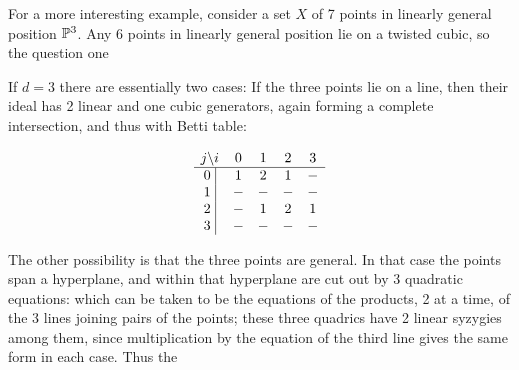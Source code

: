 \begin{example}
\begin{example}[Points in $\PP^3$]
For a more interesting example, consider a set $X$ of 7 points in linearly general position $\PP^3$. Any 6 points in linearly general position lie on a twisted cubic, so the question
one
\end{example}


If $d=3$ there are essentially two cases: If the three points  lie on a line, then their ideal has 2 linear and one cubic generators, again forming a complete intersection, and thus with Betti table:
\begin{small}
$$
\begin{matrix}
j \backslash i     &0&1&2&3\\ \hline
\text{0 }\vline &1&2&1&-\\
\text{1 }\vline &-&-&-&-\\
\text{2 }\vline &-&1&2&1\\
\text{3 }\vline &-&-&-&-\\
\end{matrix}
$$
\end{small}
The other possibility is that the three points are general. In that case the points span a hyperplane, and within that hyperplane are cut out by
3 quadratic equations: which can be taken to be the equations of the products, 2 at a time, of the 3 lines joining pairs of the points; these three quadrics
have 2 linear syzygies among them, since multiplication by the equation of the third line gives the same form in each case. Thus the 


\end{example}

